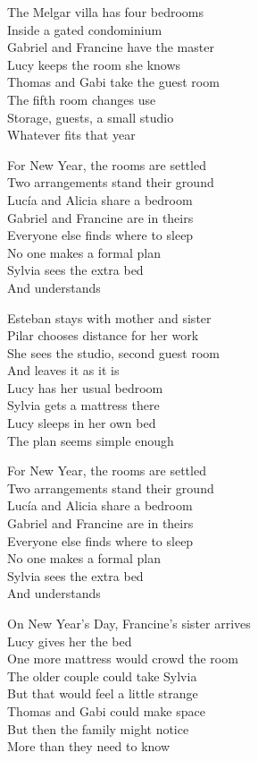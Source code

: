 \begin{lyrics}
The Melgar villa has four bedrooms\\
Inside a gated condominium\\
Gabriel and Francine have the master\\
Lucy keeps the room she knows\\
Thomas and Gabi take the guest room\\
The fifth room changes use\\
Storage, guests, a small studio\\
Whatever fits that year

For New Year, the rooms are settled\\
Two arrangements stand their ground\\
Lucía and Alicia share a bedroom\\
Gabriel and Francine are in theirs\\
Everyone else finds where to sleep\\
No one makes a formal plan\\
Sylvia sees the extra bed\\
And understands

Esteban stays with mother and sister\\
Pilar chooses distance for her work\\
She sees the studio, second guest room\\
And leaves it as it is\\
Lucy has her usual bedroom\\
Sylvia gets a mattress there\\
Lucy sleeps in her own bed\\
The plan seems simple enough

For New Year, the rooms are settled\\
Two arrangements stand their ground\\
Lucía and Alicia share a bedroom\\
Gabriel and Francine are in theirs\\
Everyone else finds where to sleep\\
No one makes a formal plan\\
Sylvia sees the extra bed\\
And understands

On New Year's Day, Francine's sister arrives\\
Lucy gives her the bed\\
One more mattress would crowd the room\\
The older couple could take Sylvia\\
But that would feel a little strange\\
Thomas and Gabi could make space\\
But then the family might notice\\
More than they need to know


\end{lyrics}
